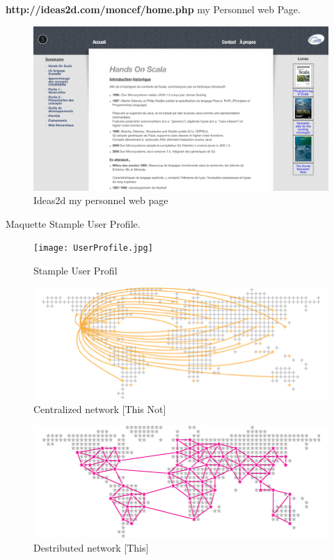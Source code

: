 \textbf{http://ideas2d.com/moncef/home.php} my Personnel web Page.
\begin{figure}[H]
        \centering
                \centering
                \includegraphics[width=\textwidth]{idea2d.png}
               \caption{Ideas2d my personnel web page}

\end{figure}
\newpage
Maquette Stample User Profile.
\begin{figure}[H]
        \centering
                \centering
                \texttt{[image: UserProfile.jpg]}
               \caption{Stample User Profil}

\end{figure}
\newpage
\begin{figure}[H]
        \centering
                \centering
                \includegraphics[width=\textwidth]{network-centralized.png}
                \caption{Centralized network [This Not]}
                \label{fig:Centralized network}               
\end{figure}

\begin{figure}[H]
        \centering
                \centering
                \includegraphics[width=\textwidth]{network-distributed.png}
                \caption{Destributed network [This]}
                \label{fig:Destributed network}               
\end{figure}